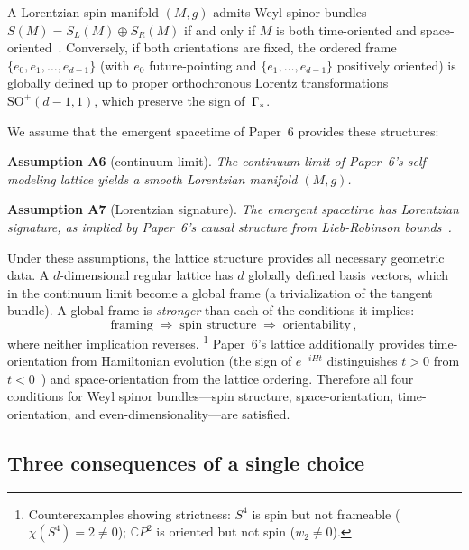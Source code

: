 \noindent
A Lorentzian spin manifold $(M,g)$ admits Weyl spinor bundles
$S(M) = S_L(M)\oplus S_R(M)$ if and only if $M$ is both
time-oriented and space-oriented~\cite{LawsonMichelsohn1989}.
Conversely, if both orientations are fixed, the ordered frame
$\{e_0,e_1,\ldots,e_{d-1}\}$ (with $e_0$ future-pointing and
$\{e_1,\ldots,e_{d-1}\}$ positively oriented) is globally defined
up to proper orthochronous Lorentz transformations
$\mathrm{SO}^+(d{-}1,1)$, which preserve the sign of~$\Gamma_*$.

We assume that the emergent spacetime of Paper~6 provides these
structures:

\medskip\noindent
\textbf{Assumption A6} (continuum limit).
\emph{The continuum limit of Paper~6's self-modeling lattice yields a
smooth Lorentzian manifold $(M,g)$.}

\medskip\noindent
\textbf{Assumption A7} (Lorentzian signature).
\emph{The emergent spacetime has Lorentzian signature, as implied by
Paper~6's causal structure from Lieb-Robinson
bounds~\cite{Paper6}.}

\medskip
Under these assumptions, the lattice structure provides all necessary
geometric data.  A $d$-dimensional regular lattice has $d$ globally
defined basis vectors, which in the continuum limit become a global
frame (a trivialization of the tangent bundle).  A global frame is
\emph{stronger} than each of the conditions it implies:
\begin{equation}\label{eq:framing-hierarchy}
  \text{framing}
  \;\Longrightarrow\;
  \text{spin structure}
  \;\Longrightarrow\;
  \text{orientability}\,,
\end{equation}
where neither implication reverses.%
\footnote{Counterexamples showing strictness: $S^4$ is spin but not
frameable ($\chi(S^4)=2\ne 0$); $\mathbb{C}P^2$ is oriented but
not spin ($w_2\ne 0$).}
Paper~6's lattice additionally provides time-orientation from
Hamiltonian evolution (the sign of $e^{-iHt}$ distinguishes
$t > 0$ from $t < 0$~\cite{Paper6}) and space-orientation from
the lattice ordering.  Therefore all four conditions for Weyl
spinor bundles---spin structure, space-orientation,
time-orientation, and even-dimensionality---are satisfied.

\subsection{Three consequences of a single choice}
\label{sec:three-consequences}

